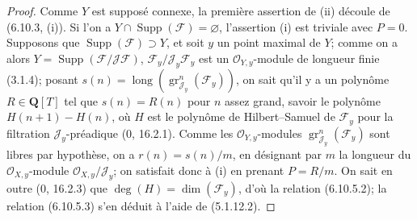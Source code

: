 \begin{proof}
Comme $Y$ est supposé connexe, la première assertion de (ii) découle de
(6.10.3, (i)). Si l'on a
$Y\cap\operatorname{Supp}(\mathcal F)=\varnothing$, l'assertion (i) est
triviale avec $P=0$. Supposons que
$\operatorname{Supp}(\mathcal F)\supset Y$, et soit $y$ un point maximal de
$Y$; comme on a alors $Y=\operatorname{Supp}(\mathcal F/\mathcal J\mathcal F)$,
$\mathcal F_y/\mathcal J_y\mathcal F_y$ est un
$\mathcal O_{Y,y}$-module de longueur finie (3.1.4); posant
$s(n)=\operatorname{long}(\operatorname{gr}_{\mathcal J_y}^{n}(\mathcal F_y))$,
on sait qu'il y a un polynôme $R\in\mathbf Q[T]$ tel que $s(n)=R(n)$ pour
$n$ assez grand, savoir le polynôme $H(n+1)-H(n)$, où $H$ est le polynôme
de Hilbert--Samuel de $\mathcal F_y$ pour la filtration
$\mathcal J_y$-préadique (0, 16.2.1). Comme les
$\mathcal O_{Y,y}$-modules
$\operatorname{gr}_{\mathcal J_y}^{n}(\mathcal F_y)$ sont libres par
hypothèse, on a $r(n)=s(n)/m$, en désignant par $m$ la longueur du
$\mathcal O_{X,y}$-module $\mathcal O_{X,y}/\mathcal J_y$; on satisfait donc
à (i) en
prenant $P=R/m$. On sait en outre (0, 16.2.3) que
$\deg(H)=\dim(\mathcal F_y)$, d'où la relation (6.10.5.2); la relation
(6.10.5.3) s'en déduit à l'aide de (5.1.12.2).



\end{proof}

